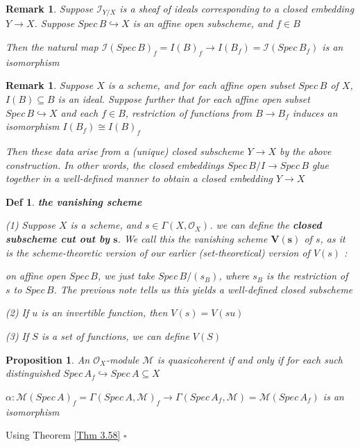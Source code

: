 \documentclass{article}
\newtheorem{definition}[theorem]{Def}
\newtheorem{proposition}[theorem]{Proposition}
\newtheorem{remark}[theorem]{Remark}
\newenvironment{Proof}{{\noindent \indent \it Proof:\quad}}{\hfill $\square$\par}
\begin{document}
\begin{remark}
Suppose $\mathcal I_{Y/X}$ is a sheaf of ideals corresponding to a closed
embedding $Y \to X$. Suppose $Spec\, B \hookrightarrow X$ is an affine open subscheme, and $f \in B$

Then the natural map $\mathcal I(Spec\,B)_f=I(B)_f \to I(B_f)= \mathcal I(Spec\,B_f)$ is an isomorphism
\end{remark}

\begin{remark}
Suppose $X$ is a scheme, and for
each affine open subset $Spec\, B$ of $X$, $I(B) \subseteq B$ is an ideal. Suppose further that for
each affine open subset $Spec\, B \hookrightarrow X$ and each $f \in B$, restriction of functions from
$B \to B_f$ induces an isomorphism $I(B_f) \cong I(B)_f$

Then these data arise from a
(unique) closed subscheme $Y \to X$ by the above construction. In other words, the
closed embeddings $Spec\, B/I \to Spec\, B$ glue together in a well-defined manner to
obtain a closed embedding $Y \to X$
\end{remark}

\begin{definition}
\textbf{the vanishing scheme}

(1) Suppose $X$ is a scheme, and $s \in \Gamma (X, \mathcal O_X)$. we can define the \textbf{closed subscheme cut out
by} $\bm s$. We call this the vanishing scheme $\bm{V(s)}$ of $s$, as it is the scheme-theoretic
version of our earlier (set-theoretical) version of $V(s)$ : 

on affine open
$Spec\, B$, we just take $Spec\,B/(s_B)$, where $s_B$ is the restriction of $s$ to $Spec\, B$. The previous note tells us this yields a well-defined closed subscheme

(2) If $u$ is an invertible function, then $V(s) = V(su)$

(3) If $S$ is a set of functions, we can define $V(S)$
\end{definition}

\begin{proposition}
An $\mathcal O_X$-module $\mathcal M$ is quasicoherent
if and only if for each such distinguished $Spec\, A_f \hookrightarrow Spec\, A \subseteq X$

$\alpha:\mathcal M(Spec\,A)_f = \Gamma(Spec\,A,\mathcal M)_f \to \Gamma(Spec\,A_f,\mathcal M) = \mathcal M(Spec\,A_f)$ is an isomorphism
\end{proposition}
\begin{Proof}
    Using Theorem \ref{Thm 3.58}
\end{Proof}
\end{document}
